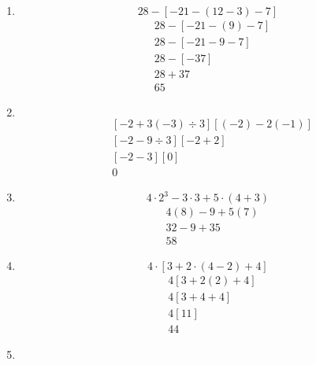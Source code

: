 \documentclass[12pt,letterpaper]{report}
\begin{document}
\begin{enumerate}
\begin{equation*}
     6-(-9+7-1)-[3-(-5+4+6)-1]
    \end{equation*}
    \begin{align*}
        &6-(-3)-[3-(5)-1]\\
        &6+3-[3-5-1]\\
        &6+3-[-3]\\
        &6+3+3\\
        &12
    \end{align*}
    \item \begin{equation*}
        28-[-21-(12-3)-7]
    \end{equation*}
    \begin{align*}
        &28-[-21-(9)-7]\\
        &28-[-21-9-7]\\
        &28-[-37]\\
        &28+37\\
        &65
    \end{align*}
    \item \begin{equation*}
        [-2+3 \cdot (2-5) \div 3] [(3-5+2)-2 \cdot (3-4)]
    \end{equation*}
    \begin{align*}
        &[-2+3(-3)\div 3][(-2)-2(-1)]\\
        &[-2-9  \div 3][-2+2]\\
        &[-2-3][0]\\
        &0
    \end{align*}
    \item \begin{equation*}
        4 \cdot 2^3-3 \cdot 3 +5 \cdot (4+3)
    \end{equation*}
    \begin{align*}
        &4(8)-9+5(7)\\
        &32-9+35\\
        &58
    \end{align*}
    \item \begin{equation*}
        4 \cdot [3+2 \cdot (4-2)+4]
    \end{equation*}
    \begin{align*}
        &4[3+2(2)+4]\\
        &4[3+4+4]\\
        &4[11]\\
        &44
    \end{align*}
    \item \begin{equation*}

\end{equation*}
\end{enumerate}
\end{document}
